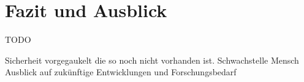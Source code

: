 \chapter{Fazit und Ausblick}\label{ch:FazitundAusblick}

TODO

Sicherheit vorgegaukelt die so noch nicht vorhanden ist. Schwachstelle Mensch 
Ausblick auf zukünftige Entwicklungen und Forschungsbedarf


